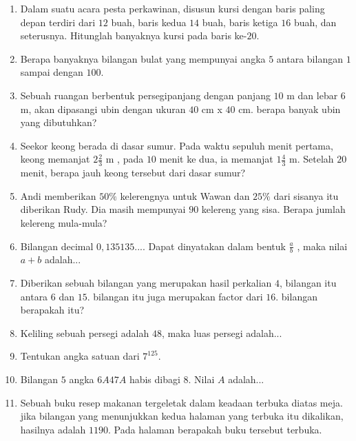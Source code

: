 \documentclass[11pt]{scrartcl}
\begin{document}
\begin{enumerate}
\item Dalam suatu acara pesta perkawinan, disusun kursi dengan baris paling depan terdiri dari $12$ buah, baris kedua $14$ buah, baris ketiga $16$ buah, dan seterusnya. Hitunglah banyaknya kursi pada baris ke-$20$.
\item Berapa banyaknya bilangan bulat yang mempunyai angka $5$ antara bilangan $1$ sampai dengan $100$.
\item Sebuah ruangan berbentuk persegipanjang dengan panjang $10$ m dan lebar $6$ m, akan dipasangi ubin dengan ukuran $40$ cm x $40$ cm. berapa banyak ubin yang dibutuhkan?
\item Seekor keong berada di dasar sumur. Pada waktu sepuluh menit pertama, keong memanjat $2 \frac{2}{3}$ m , pada $10$ menit ke dua, ia memanjat $1 \frac{4}{3}$ m. Setelah $20$ menit, berapa jauh keong tersebut dari dasar sumur?
\item Andi memberikan $50\%$ kelerengnya untuk Wawan dan $25\%$ dari sisanya itu diberikan Rudy. Dia masih mempunyai $90$ kelereng yang sisa. Berapa jumlah kelereng mula-mula?
\item Bilangan decimal $0,135135....$ Dapat dinyatakan dalam bentuk $\frac{a}{b}$ , maka nilai $a+b$ adalah...
\item Diberikan sebuah bilangan yang merupakan hasil perkalian $4$, bilangan itu antara $6$ dan $15$. bilangan itu juga merupakan factor dari $16$. bilangan berapakah itu?
\item Keliling sebuah persegi adalah $48$, maka luas persegi adalah...
\item Tentukan angka satuan dari $7^{125}$.
\item Bilangan $5$ angka $6A47A$ habis dibagi $8$. Nilai $A$ adalah...
\item Sebuah buku resep makanan tergeletak dalam keadaan terbuka diatas meja.
jika bilangan yang menunjukkan kedua halaman yang terbuka itu dikalikan, hasilnya adalah $1190$. Pada halaman berapakah buku tersebut terbuka.


\end{enumerate}
\end{document}
